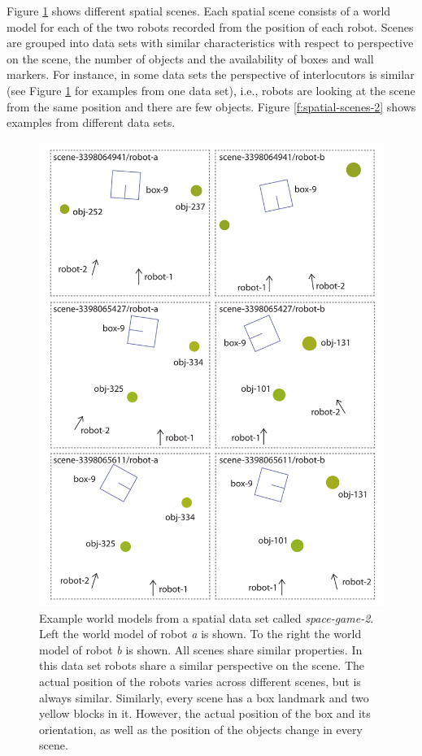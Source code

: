Figure \ref{f:spatial-scenes-1} shows different spatial scenes. Each spatial scene 
consists of a world model for each of the two robots recorded from the position of 
each robot. Scenes are grouped into data sets with similar characteristics
with respect to perspective on the scene, the number of objects and
the availability of boxes and wall markers. For instance, in some data sets the perspective of interlocutors is similar (see Figure \ref{f:spatial-scenes-1} for 
examples from one data set), i.e., robots
are looking at the scene from the same position and there are few objects.
Figure \ref{f:spatial-scenes-2} shows examples from different data sets.

\begin{figure}
\begin{center}
\includegraphics[width=0.8\columnwidth]{figs/spatial-scenes-overview-1}
\end{center}
\caption[Example world models]{Example world models from a spatial data
set called \emph{space-game-2}. Left the world model of 
robot \emph{a} is shown. To the right the world model of robot 
\emph{b} is shown. All scenes share similar properties. In 
this data set robots share a similar perspective on the scene.
The actual position of the robots varies across different scenes, but is always similar.
Similarly, every scene has a box landmark and two yellow blocks in it. 
However, the actual position of the box and its orientation, as well as the
position of the objects change in every scene.}
\label{f:spatial-scenes-1}
\end{figure}

